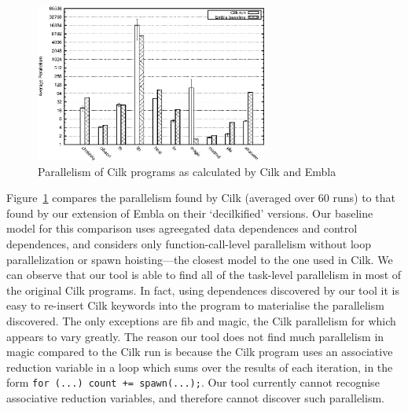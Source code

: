 \begin{figure}
 \centering
 \includegraphics[width=3in]{cilk-run}
 \caption{Parallelism of Cilk programs as calculated by Cilk and Embla}
 \label{cilk-run}
\end{figure}

Figure~\ref{cilk-run} compares the parallelism found by Cilk (averaged over 60 runs) to that found by our extension of Embla on their `decilkified' versions.
Our baseline model for this comparison uses agreegated data dependences and control dependences, and considers only function-call-level parallelism without loop parallelization or spawn hoisting---the closest model to the one used in Cilk.
We can observe that our tool is able to find all of the task-level parallelism in most of the original Cilk programs.
In fact, using dependences discovered by our tool it is easy to re-insert Cilk keywords into the program to materialise the parallelism discovered.
The only exceptions are fib and magic, the Cilk parallelism for which appears to vary greatly.
The reason our tool does not find much parallelism in magic compared to the Cilk run is because the Cilk program uses an associative reduction variable in a loop which sums over the results of each iteration, in the form \texttt{for (...) count += spawn(...);}.
Our tool currently cannot recognise associative reduction variables, and therefore cannot discover such parallelism.

